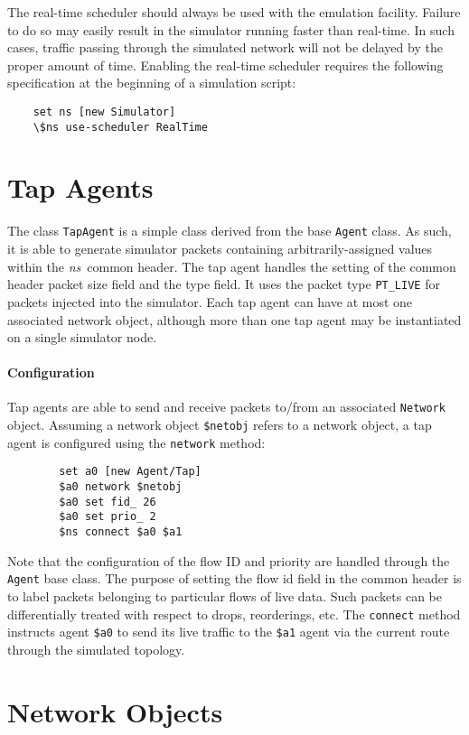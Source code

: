 The real-time scheduler should always be used with the emulation facility.
Failure to do so may easily result in the simulator running faster
than real-time.
In such cases, traffic passing through the simulated network will
not be delayed by the proper amount of time.
Enabling the real-time scheduler requires the
following specification at the beginning of a simulation script:
\begin{verbatim}
    set ns [new Simulator]
    \$ns use-scheduler RealTime
\end{verbatim}

\section{Tap Agents}

The class {\tt TapAgent} is a simple class derived from the base
{\tt Agent} class.
As such, it is able to generate simulator packets containing
arbitrarily-assigned values within the \emph{ns}~common header.
The tap agent handles the setting of the common header packet
size field and the type field.  
It uses the packet type {\tt PT\_LIVE} for packets injected
into the simulator.
Each tap agent can have at most one associated network object, although
more than one tap agent may be instantiated on a single simulator node.

\paragraph{Configuration}
Tap agents are able to send and receive packets to/from an
associated {\tt Network} object.
Assuming a network object {\tt \$netobj} refers to a network
object, a tap agent is configured using the {\tt network} method:
\begin{verbatim}
        set a0 [new Agent/Tap]
        $a0 network $netobj
        $a0 set fid_ 26
        $a0 set prio_ 2
        $ns connect $a0 $a1
\end{verbatim}
Note that the configuration of the flow ID and priority are
handled through the {\tt Agent} base class.
The purpose of setting the flow id field in the common header
is to label packets belonging to particular flows of live data.
Such packets can be differentially treated with respect
to drops, reorderings, etc.
The {\tt connect} method instructs agent {\tt \$a0} to send
its live traffic to the {\tt \$a1} agent via the current
route through the simulated topology.

\section{Network Objects}
\label{sec:networkobj}

